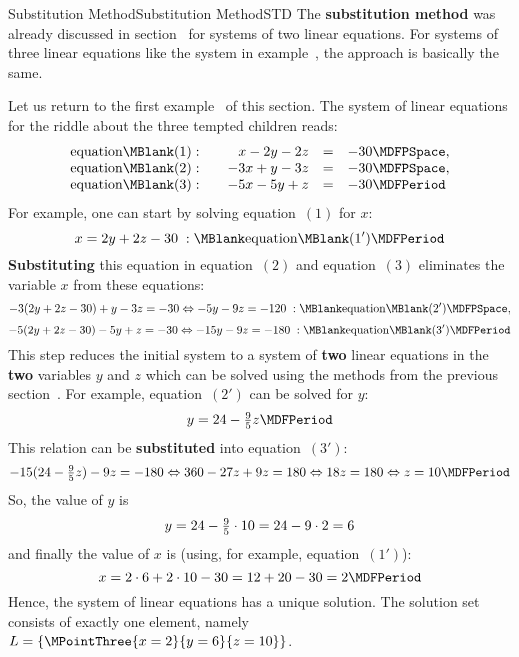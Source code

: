 \begin{MXContent}{Substitution Method}{Substitution Method}{STD}
The \textbf{substitution method} was already discussed in 
section~ for systems of two linear equations. 
For systems of three linear equations like the system in example~,
the approach is basically the same.

\begin{MExample}
Let us return to the first example~ of this section. The 
system of linear equations for the riddle about the three tempted children reads:
$$\begin{array}{lcrcl} \mbox{equation}\MBlank (1): & & x - 2 y - 2 z & = & - 30 \MDFPSpace, \\
\mbox{equation}\MBlank (2): & & - 3 x + y - 3 z & = & - 30 \MDFPSpace, \\
\mbox{equation}\MBlank (3): & & - 5 x - 5 y + z & = & - 30 \MDFPeriod \end{array}$$
For example, one can start by solving equation~$(1)$ for $x$:
$$x = 2 y + 2 z - 30 \; : \MBlank\mbox{equation}\MBlank (1') \MDFPeriod$$
\textbf{Substituting} this equation in equation~$(2)$ and equation~$(3)$ eliminates
the variable $x$ from these equations:
$$- 3 (2 y + 2 z - 30) + y - 3 z = - 30 \Leftrightarrow - 5 y - 9 z = - 120 \; : \MBlank\mbox{equation}\MBlank (2') \MDFPSpace, $$
$$- 5 (2 y + 2 z - 30) - 5 y + z = - 30 \Leftrightarrow - 15 y - 9 z = - 180 \; : \MBlank\mbox{equation}\MBlank (3') \MDFPeriod $$
This step reduces the initial system to a system of \textbf{two} linear equations in the \textbf{two} variables
$y$ and $z$ which can be solved using the methods from the previous section~.
For example, equation~$(2')$ can be solved for $y$:
 $$y = 24 - \Mtfrac95 z \MDFPeriod$$
This relation can be \textbf{substituted} into equation~$(3')$:
$$- 15 (24 - \Mtfrac95 z) - 9 z = - 180 \Leftrightarrow 360 - 27 z + 9 z = 180 \Leftrightarrow 18 z = 180
\Leftrightarrow z = 10 \MDFPeriod$$
So, the value of $y$ is
$$y = 24 - \tfrac{9}{5} \cdot 10 = 24 - 9 \cdot 2 = 6 $$
and finally the value of $x$ is (using, for example, equation~$(1')$):
$$x = 2 \cdot 6 + 2 \cdot 10 - 30 = 12 + 20 - 30 = 2 \MDFPeriod$$
Hence, the system of linear equations has a unique solution. The solution set consists of exactly
one element, namely ${\ML} = \{ \MPointThree{x = 2}{y = 6}{z = 10} \}$.
\end{MExample}


\end{MXContent}
